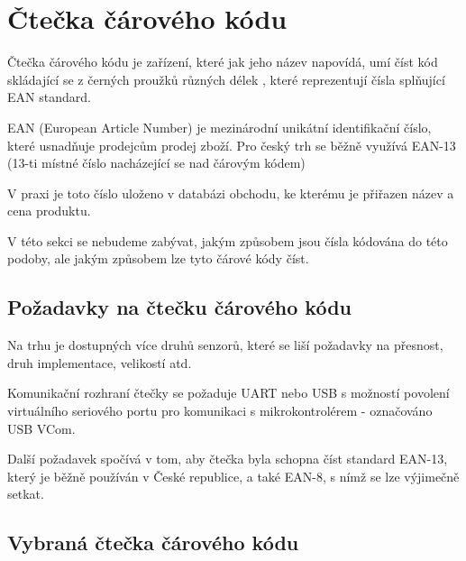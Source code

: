 
\section{Čtečka čárového kódu}
Čtečka čárového kódu je zařízení, které jak jeho název napovídá, umí číst kód skládající se z černých proužků různých délek \cite{carovy_kod}, které reprezentují čísla splňující EAN standard.

EAN (European Article Number) je mezinárodní unikátní identifikační číslo, které usnadňuje prodejcům prodej zboží. Pro český trh se běžně využívá EAN-13 (13-ti místné číslo nacházející se nad čárovým kódem) \cite{EAN}


V praxi je toto číslo uloženo v databázi obchodu, ke kterému je přiřazen název a cena produktu.


V této sekci se nebudeme zabývat, jakým způsobem jsou čísla kódována do této podoby, ale jakým způsobem lze tyto čárové kódy číst.

\subsection{Požadavky na čtečku čárového kódu}

Na trhu je dostupných více druhů senzorů, které se liší požadavky na přesnost, druh implementace, velikostí atd.

Komunikační rozhraní čtečky se požaduje UART nebo USB s možností povolení virtuálního seriového portu pro komunikaci s mikrokontrolérem - označováno USB VCom.

Další požadavek spočívá v tom, aby čtečka byla schopna číst standard EAN-13, který je běžně používán v České republice, a také EAN-8, s nímž se lze výjimečně setkat.
\subsection{Vybraná čtečka čárového kódu}


